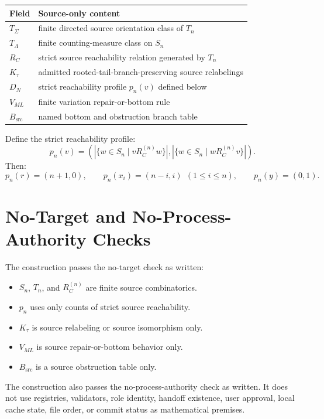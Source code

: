 \documentclass[11pt]{article}
\begin{document}
\begin{longtable}{p{}p{}}
\toprule
Field & Source-only content \\
\midrule
\(T_\Sigma\) & finite directed source orientation class of \(T_n\) \\
\(T_\Lambda\) & finite counting-measure class on \(S_n\) \\
\(R_C\) & strict source reachability relation generated by \(T_n\) \\
\(K_\tau\) & admitted rooted-tail-branch-preserving source relabelings \\
\(D_N\) & strict reachability profile \(p_n(v)\) defined below \\
\(V_{ML}\) & finite variation repair-or-bottom rule \\
\(B_{\mathrm{src}}\) & named bottom and obstruction branch table \\
\bottomrule
\end{longtable}

Define the strict reachability profile:
\[
p_n(v)=
\left(
|\{w\in S_n\mid vR_C^{(n)}w\}|,
|\{w\in S_n\mid wR_C^{(n)}v\}|
\right).
\]
Then:
\[
p_n(r)=(n+1,0),\qquad
p_n(x_i)=(n-i,i)\ \ (1\le i\le n),\qquad
p_n(y)=(0,1).
\]

\section{No-Target and No-Process-Authority Checks}
\label{no-target-and-no-process-authority-checks}

The construction passes the no-target check as written:
\begin{itemize}[leftmargin=*]
  \item \(S_n\), \(T_n\), and \(R_C^{(n)}\) are finite source combinatorics.
  \item \(p_n\) uses only counts of strict source reachability.
  \item \(K_\tau\) is source relabeling or source isomorphism only.
  \item \(V_{ML}\) is source repair-or-bottom behavior only.
  \item \(B_{\mathrm{src}}\) is a source obstruction table only.
\end{itemize}

The construction also passes the no-process-authority check as written. It
does not use registries, validators, role identity, handoff existence, user
approval, local cache state, file order, or commit status as mathematical
premises.
\end{document}
